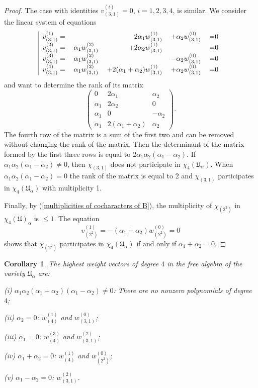 \documentclass{amsart}
\newtheorem{corollary}[theorem]{Corollary}
\theoremstyle{definition}
\begin{document}
\begin{proof}
The case with identities $v^{(i)}_{(3,1)}=0$, $i=1,2,3,4$, is similar. We consider the linear system of equations
\begin{equation}
\text{
\begin{tabular}{|rrrrl}\label{identities from (3) to (3,1)}
$v^{(1)}_{(3,1)}=$&&$2\alpha_1w_{(3,1)}^{(1)}$&$+\alpha_2w_{(3,1)}^{(0)}$&=0\\
$v^{(2)}_{(3,1)}=$&$\alpha_1w_{(3,1)}^{(2)}$&$+2\alpha_2w_{(3,1)}^{(1)}$&&=0\\
$v^{(3)}_{(3,1)}=$&$\alpha_1w_{(3,1)}^{(2)}$&&$-\alpha_2w_{(3,1)}^{(0)}$&=0\\
$v^{(4)}_{(3,1)}=$&$\alpha_1w_{(3,1)}^{(2)}$&$+2(\alpha_1+\alpha_2)w_{(3,1)}^{(1)}$&$+\alpha_2w_{(3,1)}^{(0)}$&=0\\
\end{tabular}
}
\end{equation}
and want to determine the rank of its matrix
\[
\left(\begin{matrix}
0&2\alpha_1&\alpha_2\\
\alpha_1&2\alpha_2&0\\
\alpha_1&0&-\alpha_2\\
\alpha_1&2(\alpha_1+\alpha_2)&\alpha_2
\end{matrix}\right).
\]
The fourth row of the matrix is a sum of the first two and can be removed without changing the rank of the matrix.
Then the determinant of the matrix formed by the first three rows is equal to $2\alpha_1\alpha_2(\alpha_1-\alpha_2)$.
If $\alpha_1\alpha_2(\alpha_1-\alpha_2)\not=0$, then $\chi_{(3,1)}$ does not participate in $\chi_4({\mathfrak U}_{\alpha})$.
When $\alpha_1\alpha_2(\alpha_1-\alpha_2)=0$ the rank of the matrix is equal to 2 and
$\chi_{(3,1)}$ participates in $\chi_4({\mathfrak U}_{\alpha})$ with multiplicity 1.

Finally, by (\ref{multiplicities of cocharacters of B}), the multiplicity of $\chi_{(2^2)}$ in $\chi_4({\mathfrak U})_{\alpha}$
is $\leq 1$. The equation
\[
v^{(1)}_{(2^2)}=-(\alpha_1+\alpha_2)w_{(2^2)}^{(0)}=0
\]
shows that $\chi_{(2^2)}$ participates in $\chi_4({\mathfrak U}_{\alpha})$ if and only if $\alpha_1+\alpha_2=0$.
\end{proof}

\begin{corollary}\label{hwv in subvariety}
The highest weight vectors of degree $4$ in the free algebra of the variety ${\mathfrak U}_{\alpha}$ are:

{\rm (i)} $\alpha_1\alpha_2(\alpha_1+\alpha_2)(\alpha_1-\alpha_2)\not=0$: There are no nonzero polynomials of degree $4$;

{\rm (ii)} $\alpha_2=0$: $w_{(4)}^{(1)}$ and $w_{(3,1)}^{(0)}$;

{\rm (iii)} $\alpha_1=0$: $w_{(4)}^{(3)}$ and $w_{(3,1)}^{(2)}$;

{\rm (iv)} $\alpha_1+\alpha_2=0$: $w_{(4)}^{(1)}$ and $w_{(2^2)}^{(0)}$;

{\rm (v)} $\alpha_1-\alpha_2=0$: $w_{(3,1)}^{(2)}$.
\end{corollary}
\end{document}
